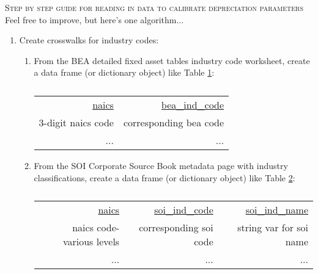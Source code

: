 \documentclass[a4paper]{article}
\begin{document}


\begin{center}
\large  \textsc {Step by step guide for reading in data to calibrate depreciation parameters}\\
\small{Feel free to improve, but here's one algorithm...}\\
\end{center}
\vspace{.5\baselineskip}


\begin{enumerate}
\item Create crosswalks for industry codes:
	\begin{enumerate}
	\item From the BEA detailed fixed asset tables industry code worksheet, create a data frame (or dictionary object) like Table \ref{tab:step1a}:
	
\begin{table}[h!]
  \centering
  \caption{}
    \begin{tabular}{rr}
   \underline{naics} & \underline{bea\_ind\_code} \\
  3-digit naics code & corresponding bea code \\
   ...     & ... \\
    \end{tabular}%
  \label{tab:step1a}%
\end{table}%
	
	\item From the SOI Corporate Source Book metadata page with industry classifications, create a data frame (or dictionary object) like Table \ref{tab:step1b}:
	
\begin{table}[h!]
  \centering
  \caption{}
    \begin{tabular}{rrr}
    
    \underline{naics} & \underline{soi\_ind\_code} & \underline{soi\_ind\_name} \\
    
    naics code- various levels & corresponding soi code & string var for soi name \\
    ...     & ...     & ... \\
    
    \end{tabular}%
  \label{tab:step1b}%
\end{table}%



\end{enumerate}
\end{enumerate}
\end{document}
